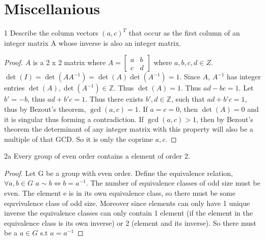 \documentclass{article}
\newcommand{\Z}{\mathbb{Z}}
\begin{document}
\section*{Miscellanious}

\begin{PROB}{1}\label{Problem 1.}
    Describe the column vectors $(a, c)^T$ that occur as the first column of an integer matrix A whose inverse is also an integer matrix.
\end{PROB}
\begin{proof}
    $A$ is a 2 x 2 matrix where $A = \begin{bmatrix}
        a & b \\ c & d
    \end{bmatrix}$ where $a,b,c,d \in Z$. $\det(I) = \det(AA^{-1}) = \det(A)\det(A^{-1})= 1$. Since $A$, $A^{-1}$ has integer entries $\det(A), \det(A^{-1}) \in \Z$. Thus $\det(A) = 1$. Thus $ad - bc = 1$. Let $b' = -b$, thus $ad + b'c = 1$. Thus there exists $b', d \in \Z$, such that $ad + b'c =1 $, thus by Bezout's theorem, $\gcd(a, c) = 1$. If $a = c = 0$, then $\det(A) = 0$ and it is singular thus forming a contradiction. If $\gcd(a, c) > 1$, then by Bezout's theorem the determinant of any integer matrix with this property will also be a multiple of that GCD. So it is only the coprime $a, c$.
\end{proof}

\bigskip

\begin{claim}{2a}
    Every group of even order contains a element of order 2.
\end{claim}
\begin{proof}
    Let G be a group with even order. Define the equivalence relation, $\forall a, b \in G$ $a \sim b \iff b = a^{-1}$. The number of equivalence classes of odd size must be even. The element e is in its own equivalence class, so there must be some equvivalence class of odd size. Moreover since elements can only have 1 unique inverse the equivalence classes can only contain 1 element (if the element in the equivalence class is its own inverse) or 2 (element and its inverse). So there must be a $a \in G$ s.t $a = a^{-1}$
\end{proof}
\end{document}
